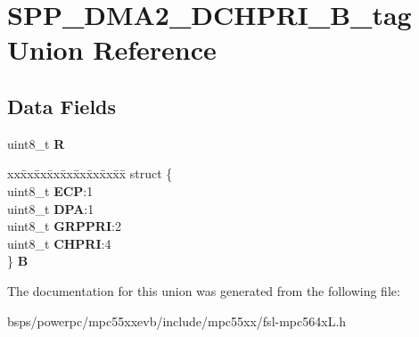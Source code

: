 \hypertarget{unionSPP__DMA2__DCHPRI__8B__tag}{}\section{S\+P\+P\+\_\+\+D\+M\+A2\+\_\+\+D\+C\+H\+P\+R\+I\+\_\+B\+\_\+tag Union Reference}
\label{unionSPP__DMA2__DCHPRI__8B__tag}
\subsection*{Data Fields}
\begin{DoxyCompactItemize}
\item 
\mbox{\label{unionSPP__DMA2__DCHPRI__8B__tag_a21d45fc865532ad79d962b457cd43aed}} 
uint8\+\_\+t {\bfseries R}
\item 
\mbox{\label{unionSPP__DMA2__DCHPRI__8B__tag_a9b8d59de81cf009866fddd077c25af71}} 
\begin{tabbing}
xx\=xx\=xx\=xx\=xx\=xx\=xx\=xx\=xx\=\kill
struct \{\\
\>uint8\_t {\bfseries ECP}:1\\
\>uint8\_t {\bfseries DPA}:1\\
\>uint8\_t {\bfseries GRPPRI}:2\\
\>uint8\_t {\bfseries CHPRI}:4\\
\} {\bfseries B}\\

\end{tabbing}\end{DoxyCompactItemize}


The documentation for this union was generated from the following file\+:\begin{DoxyCompactItemize}
\item 
bsps/powerpc/mpc55xxevb/include/mpc55xx/fsl-\/mpc564x\+L.\+h\end{DoxyCompactItemize}
